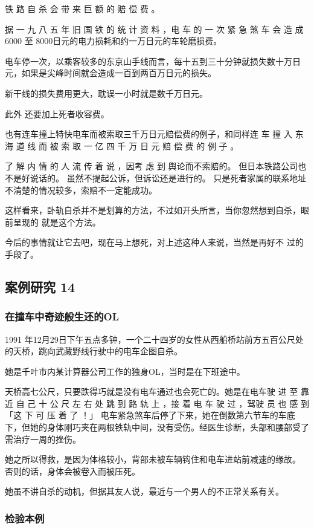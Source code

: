 \documentclass[UTF8]{ctexart}
\begin{document}
铁 路 自 杀 会 带 来 巨 额 的 赔 偿 费 。

据 一 九 八 五 年 旧 国 铁 的 统 计 资 料 ，电 车 的 一 次 紧 急 煞 车 会 造 成$6000$ 至 $8000$日元的电力损耗和约一万日元的车轮磨损费。

电车停一次，以乘客较多的东京山手线而言，每十五到三十分钟就损失数十万日元，如果是尖峰时间就会造成一百到两百万日元的损失。

新干线的损失费用更大，耽误一小时就是数千万日元。

此外 还要加上死者收容费。

也有连车撞上特快电车而被索取三千万日元赔偿费的例子，和同样连 车 撞 入 东 海 道 线 而 被 索 取 一 亿 四 千 万 日 元 赔 偿 费 的 例 子 。

了 解 内 情 的 人 流 传 着 说 ，因考 虑 到 舆论而不索赔的。
但日本铁路公司也不是好说话的。
虽然不提起公诉，但诉讼还是进行的。 
只是死者家属的联系地址不清楚的情况较多，索赔不一定能成功。 

这样看来，卧轨自杀并不是划算的方法，不过如开头所言，当你忽然想到自杀，眼前呈现的 就是这个方法。

今后的事情就让它去吧，现在马上想死，对上述这种人来说，当然是再好不 过的手段了。

\subsection{案例研究 14}

\subsubsection*{在撞车中奇迹般生还的OL}

1991 年12月29日下午五点多钟，一个二十四岁的女性从西船桥站前方五百公尺处
的天桥，跳向武藏野线行驶中的电车企图自杀。

她是千叶市内某计算器公司工作的独身OL，当时是在下班途中。

天桥高七公尺，只要跌得巧就是没有电车通过也会死亡的。她是在电车驶 进 至 靠 近 自 己 十 公 尺 左 右 处 跳 到 路 轨 上 ，接 着 电 车 驶 过 ，驾驶 员 也 感 到「这 下 可 压 着 了 ！」 电车紧急煞车后停了下来，她在倒数第六节车的车底下，但她的身体刚巧夹在两根铁轨中间，没有受伤。经医生诊断，头部和腰部受了需治疗一周的挫伤。

她之所以得救，是因为体格较小，背部未被车辆钩住和电车进站前减速的缘故。
否则的话，身体会被卷入而被压死。

她虽不讲自杀的动机，但据其友人说，最近与一个男人的不正常关系有关。

\subsubsection*{检验本例}
\end{document}
